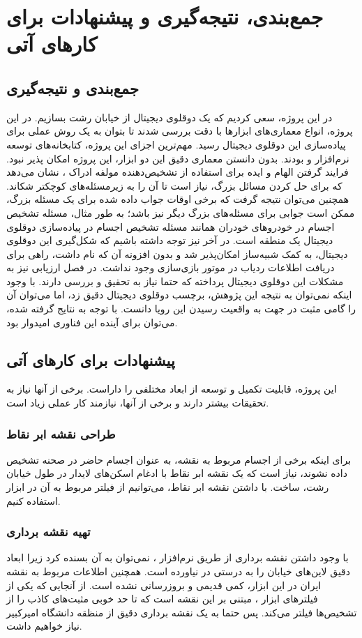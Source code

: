 \chapter{جمع‌بندی، نتیجه‌گیری و پیشنهادات برای کارهای آتی}
\section{جمع‌بندی و نتیجه‌گیری}
در این پروژه، سعی کردیم که یک دوقلوی دیجیتال از خیابان رشت بسازیم. در این پروژه، انواع معماری‌های ابزارها با دقت بررسی شدند تا بتوان به یک روش عملی برای پیاده‌سازی این دوقلوی دیجیتال رسید. مهم‌ترین اجزای این پروژه، کتابخانه‌های توسعه نرم‌افزار  و  بودند. بدون دانستن معماری دقیق این دو ابزار، این پروژه امکان پذیر نبود. فرایند گرفتن الهام و ایده برای استفاده از تشخیص‌دهنده مولفه ادراک ، نشان می‌دهد که برای حل کردن مسائل بزرگ، نیاز است تا آن را به زیرمسئله‌های کوچکتر شکاند. همچنین می‌توان نتیجه گرفت که برخی اوقات جواب داده شده برای یک مسئله بزرگ، ممکن است جوابی برای مسئله‌های بزرگ دیگر نیز باشد؛ به طور مثال، مسئله تشخیص اجسام در خودرو‌های خودران همانند مسئله تشخیص اجسام در پیاده‌سازی دوقلوی دیجیتال یک منطقه است.
در آخر نیز توجه داشته باشیم که شکل‌گیری این دوقلوی دیجیتال، به کمک شبیه‌ساز  امکان‌پذیر شد و بدون افزونه آن که  نام داشت، راهی برای دریافت اطلاعات ردیاب در موتور بازی‌سازی  وجود نداشت.
در فصل ارزیابی نیز به مشکلات این دوقلوی دیجیتال پرداخته که حتما نیاز به تحقیق و بررسی دارند. با وجود اینکه نمی‌توان به نتیجه این پژوهش، برچسب دوقلوی دیجیتال دقیق زد، اما می‌توان آن را گامی مثبت در جهت به واقعیت رسیدن این رویا دانست. با توجه به نتایج گرفته شده، می‌توان برای آینده این فناوری امیدوار بود.

\section{پیشنهادات برای کارهای آتی}
این پروژه، قابلیت تکمیل و توسعه از ابعاد مختلفی را داراست. برخی از آنها نیاز به تحقیقات بیشتر دارند و برخی از آنها، نیازمند کار عملی زیاد است. 

\subsection{طراحی نقشه ابر نقاط}
برای اینکه برخی از اجسام مربوط به نقشه، به عنوان اجسام حاضر در صحنه تشخیص داده نشوند، نیاز است که یک نقشه ابر نقاط با ادغام اسکن‌های لایدار در طول خیابان رشت، ساخت. با داشتن نقشه ابر نقاط، می‌توانیم از فیلتر مربوط به آن در ابزار  استفاده کنیم. 

\subsection{تهیه نقشه برداری}
با وجود داشتن نقشه برداری از طریق نرم‌افزار ، نمی‌توان به آن بسنده کرد زیرا ابعاد دقیق لاین‌های خیابان را به درستی در نیاورده است. همچنین اطلاعات مربوط به نقشه ایران در این ابزار، کمی قدیمی و بروزرسانی نشده است. از آنجایی که یکی از فیلتر‌های ابزار ، مبتنی بر این نقشه است که تا حد خوبی مثبت‌های کاذب را از تشخیص‌ها فیلتر می‌کند. پس حتما به یک نقشه برداری دقیق از منظقه دانشگاه امیرکبیر نیاز خواهیم داشت. 

